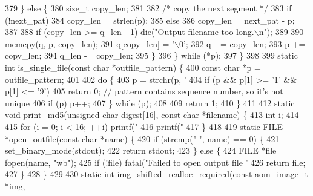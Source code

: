 \begin{DoxyCodeInclude}
{{{{{{{{{{{{{{{{{{{{{379     \} \textcolor{keywordflow}{else} \{
380       \textcolor{keywordtype}{size\_t} copy\_len;
381 
382       \textcolor{comment}{/* copy the next segment */}
383       \textcolor{keywordflow}{if} (!next\_pat)
384         copy\_len = strlen(p);
385       \textcolor{keywordflow}{else}
386         copy\_len = next\_pat - p;
387 
388       \textcolor{keywordflow}{if} (copy\_len >= q\_len - 1) die(\textcolor{stringliteral}{"Output filename too long.\(\backslash\)n"});
389 
390       memcpy(q, p, copy\_len);
391       q[copy\_len] = \textcolor{charliteral}{'\(\backslash\)0'};
392       q += copy\_len;
393       p += copy\_len;
394       q\_len -= copy\_len;
395     \}
396   \} \textcolor{keywordflow}{while} (*p);
397 \}
398 
399 \textcolor{keyword}{static} \textcolor{keywordtype}{int} is\_single\_file(\textcolor{keyword}{const} \textcolor{keywordtype}{char} *outfile\_pattern) \{
400   \textcolor{keyword}{const} \textcolor{keywordtype}{char} *p = outfile\_pattern;
401 
402   \textcolor{keywordflow}{do} \{
403     p = strchr(p, \textcolor{charliteral}{'%
404     \textcolor{keywordflow}{if} (p && p[1] >= \textcolor{charliteral}{'1'} && p[1] <= \textcolor{charliteral}{'9'})
405       \textcolor{keywordflow}{return} 0;  \textcolor{comment}{// pattern contains sequence number, so it's not unique}
406     \textcolor{keywordflow}{if} (p) p++;
407   \} \textcolor{keywordflow}{while} (p);
408 
409   \textcolor{keywordflow}{return} 1;
410 \}
411 
412 \textcolor{keyword}{static} \textcolor{keywordtype}{void} print\_md5(\textcolor{keywordtype}{unsigned} \textcolor{keywordtype}{char} digest[16], \textcolor{keyword}{const} \textcolor{keywordtype}{char} *filename) \{
413   \textcolor{keywordtype}{int} i;
414 
415   \textcolor{keywordflow}{for} (i = 0; i < 16; ++i) printf(\textcolor{stringliteral}{"%
416   printf(\textcolor{stringliteral}{"  %
417 \}
418 
419 \textcolor{keyword}{static} FILE *open\_outfile(\textcolor{keyword}{const} \textcolor{keywordtype}{char} *name) \{
420   \textcolor{keywordflow}{if} (strcmp(\textcolor{stringliteral}{"-"}, name) == 0) \{
421     set\_binary\_mode(stdout);
422     \textcolor{keywordflow}{return} stdout;
423   \} \textcolor{keywordflow}{else} \{
424     FILE *file = fopen(name, \textcolor{stringliteral}{"wb"});
425     \textcolor{keywordflow}{if} (!file) fatal(\textcolor{stringliteral}{"Failed to open output file '%
426     \textcolor{keywordflow}{return} file;
427   \}
428 \}
429 
430 \textcolor{keyword}{static} \textcolor{keywordtype}{int} img\_shifted\_realloc\_required(\textcolor{keyword}{const} \hyperlink{structaom__image}{aom\_image\_t} *img,
}}}}}}}}}}}}}}}}}}}}}}}}}
\end{DoxyCodeInclude}
